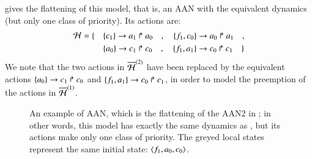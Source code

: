  gives the flattening of this model,
that is, an AAN with the equivalent dynamics
(but only one class of priority).
Its actions are:
\begin{align*}
  \mathcal{H} = \{ \quad
    & \{c_1\}\rightarrow a_1\Rsh a_0 \quad , \quad
    \{f_1, c_0\}\rightarrow a_0\Rsh a_1 \quad , \\
    & \{a_0\}\rightarrow c_1\Rsh c_0 \quad , \quad
    \{f_1, a_1\}\rightarrow c_0\Rsh c_1
  \quad \}
\end{align*}
We note that the two actions in $\overline{\mathcal{H}}^{(2)}$ have been replaced by
the equivalent actions
$\{a_0\}\rightarrow c_1\Rsh c_0$ and $\{f_1, a_1\}\rightarrow c_0\Rsh c_1$,
in order to model the preemption of the actions in $\overline{\mathcal{H}}^{(1)}$.

\begin{figure}[p]
  \centering
  \caption{
  \label{fig:metazoan-ph}
    An example of AAN, which is the flattening of the AAN$2$ in ;
    in other words, this model has exactly the same dynamics as
    , but its actions make only one class of priority.
    The greyed local states represent the same initial state:
    $\mbox{$\langle f_1, a_0, c_0 \rangle$}$.
  }
\end{figure}

